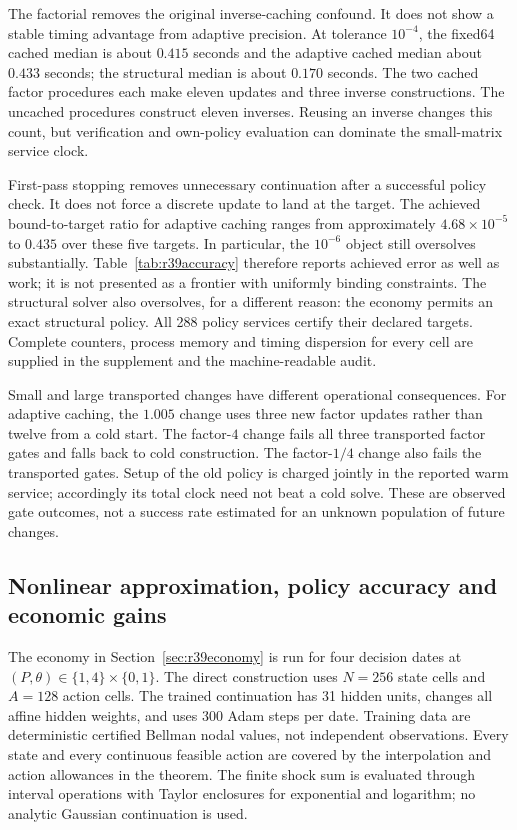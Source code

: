 

The factorial removes the original inverse-caching confound. It does not show
a stable timing advantage from adaptive precision. At tolerance $10^{-4}$,
the fixed64 cached median is about $0.415$ seconds and the adaptive cached
median about $0.433$ seconds; the structural median is about $0.170$ seconds.
The two cached factor procedures each make eleven updates and three inverse
constructions. The uncached procedures construct eleven inverses. Reusing an
inverse changes this count, but verification and own-policy evaluation can
dominate the small-matrix service clock.



First-pass stopping removes unnecessary continuation after a successful policy
check. It does not force a discrete update to land at the target. The achieved
bound-to-target ratio for adaptive caching ranges from approximately
$4.68\times10^{-5}$ to $0.435$ over these five targets. In particular, the
$10^{-6}$ object still oversolves substantially. Table~\ref{tab:r39accuracy}
therefore reports achieved error as well as work; it is not presented as a
frontier with uniformly binding constraints. The structural solver also
oversolves, for a different reason: the economy permits an exact structural
policy. All 288 policy services certify their declared targets. Complete
counters, process memory and timing dispersion for every cell are supplied in
the supplement and the machine-readable audit.

Small and large transported changes have different operational consequences.
For adaptive caching, the $1.005$ change uses three new factor updates rather
than twelve from a cold start. The factor-$4$ change fails all three transported
factor gates and falls back to cold construction. The factor-$1/4$ change also
fails the transported gates. Setup of the old policy is charged jointly in the
reported warm service; accordingly its total clock need not beat a cold solve.
These are observed gate outcomes, not a success rate estimated for an unknown
population of future changes.

\subsection{Nonlinear approximation, policy accuracy and economic gains}
The economy in Section~\ref{sec:r39economy} is run for four decision dates at
$(P,\theta)\in\{1,4\}\times\{0,1\}$. The direct construction uses $N=256$
state cells and $A=128$ action cells. The trained continuation has 31 hidden
units, changes all affine hidden weights, and uses 300 Adam steps per date.
Training data are deterministic certified Bellman nodal values, not independent
observations. Every state and every continuous feasible action are covered by
the interpolation and action allowances in the theorem. The finite shock sum
is evaluated through interval operations with Taylor enclosures for exponential
and logarithm; no analytic Gaussian continuation is used.

